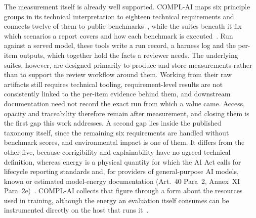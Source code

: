 \documentclass[10pt,conference]{IEEEtran}
\begin{document}
The measurement itself is already well supported.
COMPL-AI maps six principle groups in its technical interpretation to eighteen technical requirements and connects twelve of them to public benchmarks~\cite{guldimann2024complai}, while the suites beneath it fix which scenarios a report covers and how each benchmark is executed~\cite{liang2023helm,gao2021lmevalharness,derczynski2024garak,wang2023decodingtrust}.
Run against a served model, these tools write a run record, a harness log and the per-item outputs, which together hold the facts a reviewer needs.
The underlying suites, however, are designed primarily to produce and store measurements rather than to support the review workflow around them.
Working from their raw artifacts still requires technical tooling, requirement-level results are not consistently linked to the per-item evidence behind them, and downstream documentation need not record the exact run from which a value came.
Access, opacity and traceability therefore remain after measurement, and closing them is the first gap this work addresses.
A second gap lies inside the published taxonomy itself, since the remaining six requirements are handled without benchmark scores, and environmental impact is one of them.
It differs from the other five, because corrigibility and explainability have no agreed technical definition, whereas energy is a physical quantity for which the AI Act calls for lifecycle reporting standards and, for providers of general-purpose AI models, known or estimated model-energy documentation (Art.~40 Para~2, Annex~XI Para~2e)~\cite{euaiact2024}.
COMPL-AI collects that figure through a form about the resources used in training, although the energy an evaluation itself consumes can be instrumented directly on the host that runs it~\cite{rajput2024fecom}.
\end{document}
